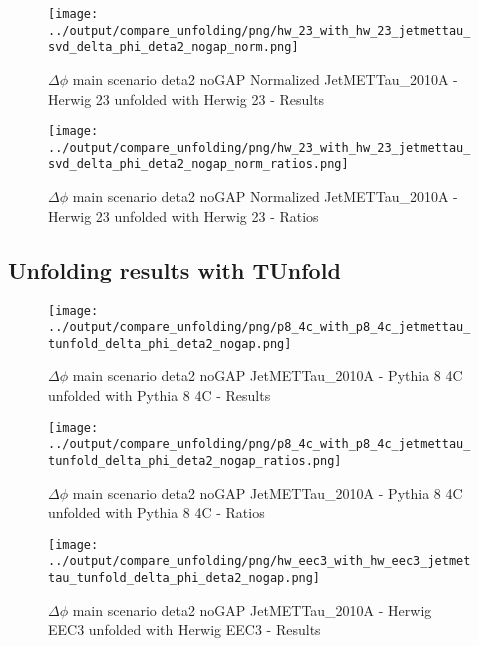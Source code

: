 \documentclass[11pt]{book}
\begin{document}
\begin{figure}[ht]
\centering
\texttt{[image: ../output/compare\_unfolding/png/hw\_23\_with\_hw\_23\_jetmettau\_svd\_delta\_phi\_deta2\_nogap\_norm.png]}
\caption{$\Delta\phi$ main scenario deta2 noGAP Normalized JetMETTau\_2010A - Herwig 23 unfolded with Herwig 23 - Results}
\label{hw_23_hw_23_jetmettau_svd_delta_phi_deta2_nogap_norm_a}
\end{figure}

\begin{figure}[ht]
\centering
\texttt{[image: ../output/compare\_unfolding/png/hw\_23\_with\_hw\_23\_jetmettau\_svd\_delta\_phi\_deta2\_nogap\_norm\_ratios.png]}
\caption{$\Delta\phi$ main scenario deta2 noGAP Normalized JetMETTau\_2010A - Herwig 23 unfolded with Herwig 23 - Ratios}
\label{hw_23_hw_23_jetmettau_svd_delta_phi_deta2_nogap_norm_b}
\end{figure}




\clearpage
\subsection{Unfolding results with TUnfold}

\begin{figure}[ht]
\centering
\texttt{[image: ../output/compare\_unfolding/png/p8\_4c\_with\_p8\_4c\_jetmettau\_tunfold\_delta\_phi\_deta2\_nogap.png]}
\caption{$\Delta\phi$ main scenario deta2 noGAP JetMETTau\_2010A - Pythia 8 4C unfolded with Pythia 8 4C - Results}
\label{p8_p8_jetmettau_tunfold_delta_phi_deta2_nogap_a}
\end{figure}

\begin{figure}[ht]
\centering
\texttt{[image: ../output/compare\_unfolding/png/p8\_4c\_with\_p8\_4c\_jetmettau\_tunfold\_delta\_phi\_deta2\_nogap\_ratios.png]}
\caption{$\Delta\phi$ main scenario deta2 noGAP JetMETTau\_2010A - Pythia 8 4C unfolded with Pythia 8 4C - Ratios}
\label{p8_p8_jetmettau_tunfold_delta_phi_deta2_nogap_b}
\end{figure}

\begin{figure}[ht]
\centering
\texttt{[image: ../output/compare\_unfolding/png/hw\_eec3\_with\_hw\_eec3\_jetmettau\_tunfold\_delta\_phi\_deta2\_nogap.png]}
\caption{$\Delta\phi$ main scenario deta2 noGAP JetMETTau\_2010A - Herwig EEC3 unfolded with Herwig EEC3 - Results}
\label{hw_eec3_hw_eec3_jetmettau_tunfold_delta_phi_deta2_nogap_a}
\end{figure}
\end{document}
